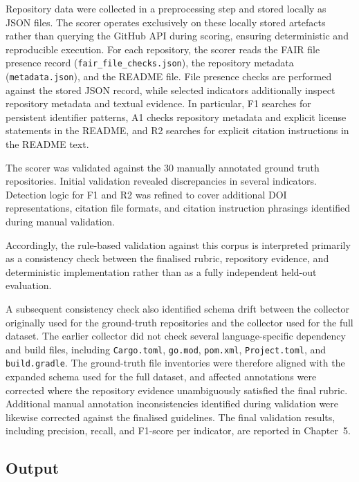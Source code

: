 Repository data were collected in a preprocessing step and stored 
locally as JSON files. The scorer operates exclusively on these 
locally stored artefacts rather than querying the GitHub API during 
scoring, ensuring deterministic and reproducible execution. For each 
repository, the scorer reads the FAIR file presence record 
(\texttt{fair\_file\_checks.json}), the repository metadata 
(\texttt{metadata.json}), and the README file. File presence checks are performed against the stored JSON record,
while selected indicators additionally inspect repository metadata
and textual evidence. In particular, F1 searches for persistent
identifier patterns, A1 checks repository metadata and explicit
license statements in the README, and R2 searches for explicit
citation instructions in the README text.

The scorer was validated against the 30 manually annotated ground
truth repositories. Initial validation revealed discrepancies in
several indicators. Detection logic for F1 and R2 was refined to
cover additional DOI representations, citation file formats, and
citation instruction phrasings identified during manual validation.

Accordingly, the rule-based validation against this corpus is
interpreted primarily as a consistency check between the finalised
rubric, repository evidence, and deterministic implementation rather
than as a fully independent held-out evaluation.

A subsequent consistency check also identified schema drift between
the collector originally used for the ground-truth repositories and
the collector used for the full dataset. The earlier collector did
not check several language-specific dependency and build files,
including \texttt{Cargo.toml}, \texttt{go.mod}, \texttt{pom.xml},
\texttt{Project.toml}, and \texttt{build.gradle}. The ground-truth
file inventories were therefore aligned with the expanded schema
used for the full dataset, and affected annotations were corrected
where the repository evidence unambiguously satisfied the final
rubric. Additional manual annotation inconsistencies identified
during validation were likewise corrected against the finalised
guidelines. The final validation results, including precision,
recall, and F1-score per indicator, are reported in Chapter~5.

\subsection{Output}


